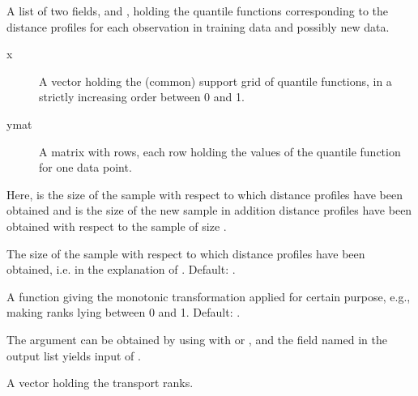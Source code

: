 \documentclass[a4paper]{book}
\begin{document}
\begin{Arguments}
\begin{ldescription}
\item[\code{qDistPrfl}] A list of two fields,  and , holding the quantile functions 
corresponding to the distance profiles for each observation in training data and possibly new data. 
\begin{description}

\item[x] A vector holding the (common) support grid of  quantile functions, 
in a strictly increasing order between 0 and 1.
\item[ymat] A matrix with  rows, each row holding the values of the 
quantile function for one data point.

\end{description}

Here,  is the size of the sample with respect to which distance profiles 
have been obtained and  is the size of the new sample in addition 
distance profiles have been obtained with respect to the sample of size .

\item[\code{n}] The size of the sample with respect to which distance profiles have been obtained, 
i.e.  in the explanation of . Default: .

\item[\code{fun}] A function giving the monotonic transformation applied for certain purpose, 
e.g., making ranks lying between 0 and 1. Default: .
\end{ldescription}
\end{Arguments}
%
\begin{Details}\relax
The argument  can be obtained by using  
with  or , and the field named  
in the output list yields input of .
\end{Details}
%
\begin{Value}
A vector holding the transport ranks.
\end{Value}
%
\begin{Examples}
\end{Examples}
\end{document}
